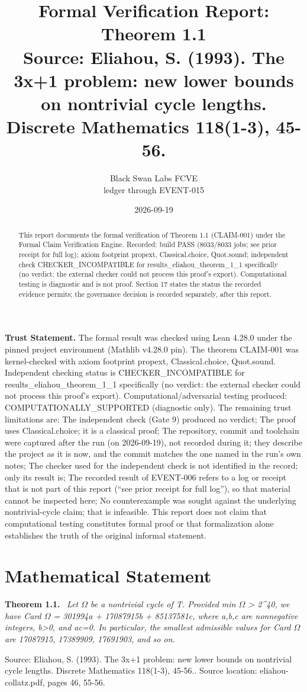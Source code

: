 \documentclass[11pt]{article}
\title{Formal Verification Report: Theorem 1.1\\[0.5em]{\large Source: Eliahou, S. (1993). The 3x+1 problem: new lower bounds on nontrivial cycle lengths. Discrete Mathematics 118(1-3), 45-56.}}
\author{Black Swan Labs FCVE \\ ledger through EVENT-015}
\date{2026-09-19}
\newenvironment{sourceresult}[1]{\par\medskip\noindent\textbf{#1.}\ \itshape}{\par\medskip}
\begin{document}
\maketitle

\noindent\textbf{Trust Statement.} The formal result was checked using Lean 4.28.0 under the pinned project environment (Mathlib v4.28.0 pin). The theorem CLAIM-001 was kernel-checked with axiom footprint propext, Classical.choice, Quot.sound. Independent checking status is CHECKER\_INCOMPATIBLE for results\_eliahou\_theorem\_1\_1 specifically (no verdict: the external checker could not process this proof's export). Computational/adversarial testing produced: COMPUTATIONALLY\_SUPPORTED (diagnostic only). The remaining trust limitations are: The independent check (Gate 9) produced no verdict; The proof uses Classical.choice; it is a classical proof; The repository, commit and toolchain were captured after the run (on 2026-09-19), not recorded during it; they describe the project as it is now, and the commit matches the one named in the run's own notes; The checker used for the independent check is not identified in the record; only its result is; The recorded result of EVENT-006 refers to a log or receipt that is not part of this report (``see prior receipt for full log''), so that material cannot be inspected here; No counterexample was sought against the underlying nontrivial-cycle claim; that is infeasible. This report does not claim that computational testing constitutes formal proof or that formalization alone establishes the truth of the original informal statement.

\begin{abstract}
This report documents the formal verification of Theorem 1.1 (CLAIM-001) under the Formal Claim Verification Engine. Recorded: build PASS (8033/8033 jobs; see prior receipt for full log); axiom footprint propext, Classical.choice, Quot.sound; independent check CHECKER\_INCOMPATIBLE for results\_eliahou\_theorem\_1\_1 specifically (no verdict: the external checker could not process this proof's export). Computational testing is diagnostic and is not proof. Section 17 states the status the recorded evidence permits; the governance decision is recorded separately, after this report.
\end{abstract}

\section{Mathematical Statement}
\begin{sourceresult}{Theorem 1.1}
Let \ensuremath{\Omega} be a nontrivial cycle of T. Provided min \ensuremath{\Omega} > 2\textasciicircum{}40, we have Card \ensuremath{\Omega} = 301994a + 17087915b + 85137581c, where a,b,c are nonnegative integers, b>0, and ac=0. In particular, the smallest admissible values for Card \ensuremath{\Omega} are 17087915, 17389909, 17691903, and so on.
\end{sourceresult}
Source: Eliahou, S. (1993). The 3x+1 problem: new lower bounds on nontrivial cycle lengths. Discrete Mathematics 118(1-3), 45-56.. Source location: eliahou-collatz.pdf, pages 46, 55-56.
\end{document}
